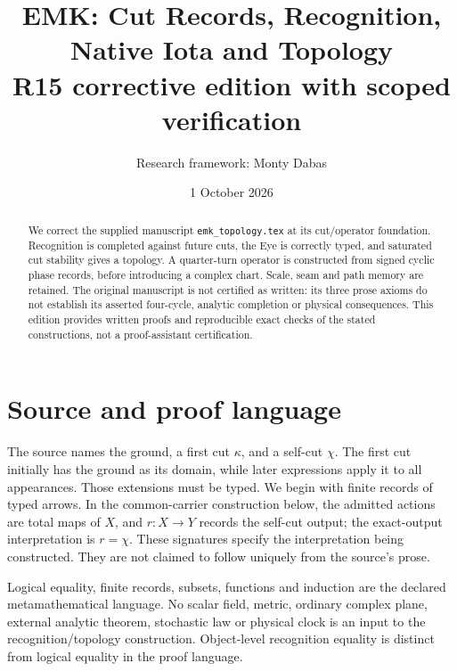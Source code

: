 \documentclass[11pt]{article}
\title{EMK: Cut Records, Recognition, Native Iota and Topology\\
\large R15 corrective edition with scoped verification}
\author{Research framework: Monty Dabas}
\date{1 October 2026}
\begin{document}
\maketitle
\begin{abstract}
We correct the supplied manuscript \texttt{emk\_topology.tex} at its
cut/operator foundation. Recognition is completed against future cuts,
the Eye is correctly typed, and saturated cut stability gives a topology.
A quarter-turn operator is constructed from signed cyclic phase records,
before introducing a complex chart. Scale, seam and path memory are retained.
The original manuscript is not certified as written: its three prose axioms
do not establish its asserted four-cycle, analytic completion or physical
consequences. This edition provides written proofs and reproducible exact
checks of the stated constructions, not a proof-assistant certification.
\end{abstract}

\section{Source and proof language}
The source names the ground, a first cut $\kappa$, and a self-cut $\chi$.
The first cut initially has the ground as its domain, while later expressions
apply it to all appearances. Those extensions must be typed. We begin with
finite records of typed arrows. In the common-carrier construction below,
the admitted actions are total maps of $X$, and $r:X\to Y$ records the
self-cut output; the exact-output interpretation is $r=\chi$.
These signatures specify the interpretation being constructed. They are not
claimed to follow uniquely from the source's prose.

Logical equality, finite records, subsets, functions and induction are the
declared metamathematical language. No scalar field, metric, ordinary complex
plane, external analytic theorem, stochastic law or physical clock is an
input to the recognition/topology construction. Object-level recognition
equality is distinct from logical equality in the proof language.
\end{document}
